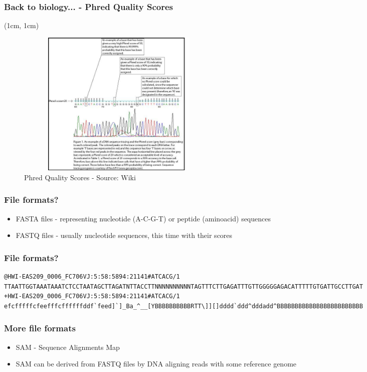 \documentclass{beamer}
\begin{document}
\begin{frame} 
    \frametitle{Back to biology... - Phred Quality Scores}
    \begin{textblock*}{10cm}(1cm, 1cm)
            \begin{figure}
                \includegraphics[width=10cm,height=7cm,keepaspectratio]{img/PhredFigure1.jpg}
                \caption{Phred Quality Scores - Source: Wiki}
            \end{figure}
    \end{textblock*}      
\end{frame}

\begin{frame}
    \frametitle{File formats?}
     {
        \begin{itemize}
            \item FASTA files - representing nucleotide (A-C-G-T) or peptide (aminoacid) sequences 
            \item FASTQ files - usually nucleotide sequences, this time with their scores
        \end{itemize}
    }
\end{frame}


\begin{frame}[fragile]
\frametitle{File formats?}
\begin{verbatim}
@HWI-EAS209_0006_FC706VJ:5:58:5894:21141#ATCACG/1
TTAATTGGTAAATAAATCTCCTAATAGCTTAGATNTTACCTTNNNNNNNNNNTAGTTTCTTGAGATTTGTTGGGGGAGACATTTTTGTGATTGCCTTGAT
+HWI-EAS209_0006_FC706VJ:5:58:5894:21141#ATCACG/1
efcfffffcfeefffcffffffddf`feed]`]_Ba_^__[YBBBBBBBBBBRTT\]][]dddd`ddd^dddadd^BBBBBBBBBBBBBBBBBBBBBBBB
\end{verbatim}
\end{frame}

\begin{frame}
    \frametitle{More file formats}
    \begin{itemize}
        \item SAM - Sequence Alignments Map
        \pause
        \item SAM can be derived from FASTQ files by DNA aligning reads with some reference genome
    \end{itemize}

\end{frame}
\end{document}
